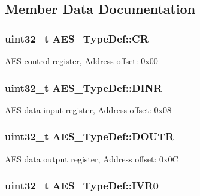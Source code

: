 \subsection{Member Data Documentation}
\hypertarget{struct_a_e_s___type_def_ad95f1a38ad551672f1d6c59299b99c1a}{
\subsubsection[{C\-R}]{ uint32\-\_\-t A\-E\-S\-\_\-\-Type\-Def\-::\-C\-R}}\label{struct_a_e_s___type_def_ad95f1a38ad551672f1d6c59299b99c1a}
A\-E\-S control register, Address offset\-: 0x00 \hypertarget{struct_a_e_s___type_def_a8df0ec8c0eae4b42c1ae5b7e01044c26}{
\subsubsection[{D\-I\-N\-R}]{ uint32\-\_\-t A\-E\-S\-\_\-\-Type\-Def\-::\-D\-I\-N\-R}}\label{struct_a_e_s___type_def_a8df0ec8c0eae4b42c1ae5b7e01044c26}
A\-E\-S data input register, Address offset\-: 0x08 \hypertarget{struct_a_e_s___type_def_a93e69a0e82607ec9480d0e395b236ead}{
\subsubsection[{D\-O\-U\-T\-R}]{ uint32\-\_\-t A\-E\-S\-\_\-\-Type\-Def\-::\-D\-O\-U\-T\-R}}\label{struct_a_e_s___type_def_a93e69a0e82607ec9480d0e395b236ead}
A\-E\-S data output register, Address offset\-: 0x0\-C \hypertarget{struct_a_e_s___type_def_a5a27101392cc89c762fc478232a8cfd9}{
\subsubsection[{I\-V\-R0}]{ uint32\-\_\-t A\-E\-S\-\_\-\-Type\-Def\-::\-I\-V\-R0}}\label{struct_a_e_s___type_def_a5a27101392cc89c762fc478232a8cfd9}
